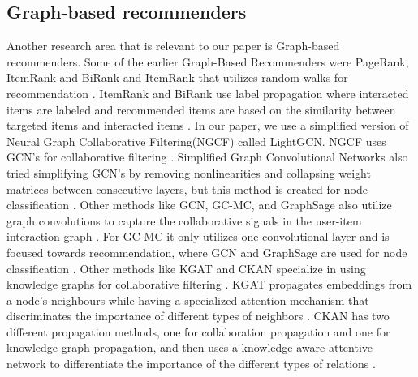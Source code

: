 \subsection{Graph-based recommenders}
Another research area that is relevant to our paper is Graph-based recommenders.
Some of the earlier Graph-Based Recommenders were PageRank, ItemRank and BiRank and ItemRank that utilizes random-walks for recommendation \cite{PageRank,BiRank,ItemRank}.
ItemRank and BiRank use label propagation where interacted items are labeled and recommended items are based on the similarity between targeted items and interacted items \cite{BiRank,ItemRank}.
In our paper, we use a simplified version of Neural Graph Collaborative Filtering(NGCF) called LightGCN.
NGCF uses GCN's for collaborative filtering \cite{lightgcn, NGCF}.
Simplified Graph Convolutional Networks also tried simplifying GCN's by removing nonlinearities and collapsing weight matrices between consecutive layers, but this method is created for node classification \cite{lightgcn,SGCN}.
Other methods like GCN, GC-MC, and GraphSage also utilize graph convolutions to capture the collaborative signals in the user-item interaction graph \cite{GCN,GC_MC,GraphSage}.
For GC-MC it only utilizes one convolutional layer and is focused towards recommendation\cite{GC_MC}, where GCN and GraphSage are used for node classification \cite{GCN,GraphSage}.
Other methods like KGAT and CKAN specialize in using knowledge graphs for collaborative filtering \cite{KGAT,CKAN}.
KGAT propagates embeddings from a node's neighbours while having a specialized attention mechanism that discriminates the importance of different types of neighbors \cite{KGAT}.
CKAN has two different propagation methods, one for collaboration propagation and one for knowledge graph propagation, and then uses a knowledge aware attentive network to differentiate the importance of the different types of relations \cite{CKAN}.


